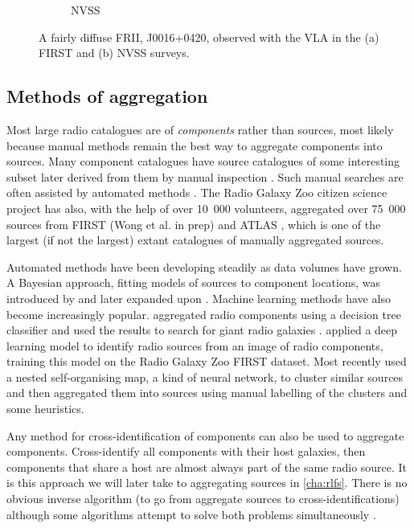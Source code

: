 \begin{figure}
\begin{subfigure}{0.45\textwidth}
                \caption{NVSS}
                \label{fig:im-contours-nvss}
            \end{subfigure}
            \caption[An example of a `resolved out' radio galaxy.]{\label{fig:resolved-out} A fairly diffuse FRII, J0016+0420, observed with the VLA in the (a) FIRST \citep{becker95first} and (b) NVSS\citep{condon98nvss} surveys. \citep[GRG1 from ][]{dabhade_discovery_2017}}
        \end{figure}

    \subsection{Methods of aggregation}
    \label{sec:methods-aggregation}

        Most large radio catalogues are of \emph{components} rather than sources, most likely because manual methods remain the best way to aggregate components into sources. Many component catalogues have source catalogues of some interesting subset later derived from them by manual inspection \citep[e.g.][]{dabhade_discovery_2017}. Such manual searches are often assisted by automated methods \citep[e.g.][]{proctor_morphological_2011}. The Radio Galaxy Zoo citizen science project has also, with the help of over 10~000 volunteers, aggregated over 75~000 sources from FIRST (Wong et al. in prep) and ATLAS \citep{banfield15}, which is one of the largest (if not the largest) extant catalogues of manually aggregated sources.

        Automated methods have been developing steadily as data volumes have grown. A Bayesian approach, fitting models of sources to component locations, was introduced by \citet{fan15} and later expanded upon \citep{fan_optimal_2020}. Machine learning methods have also become increasingly popular. \citet{proctor_selection_2016} aggregated radio components using a decision tree classifier and used the results to search for giant radio galaxies \citep[see also][]{proctor_morphological_2011,proctor06}. \citet{wu19claran} applied a deep learning model to identify radio sources from an image of radio components, training this model on the Radio Galaxy Zoo FIRST dataset. Most recently \citet{galvin_cataloguing_2020} used a nested self-organising map, a kind of neural network, to cluster similar sources and then aggregated them into sources using manual labelling of the clusters and some heuristics.

        Any method for cross-identification of components can also be used to aggregate components. Cross-identify all components with their host galaxies, then components that share a host are almost always part of the same radio source. It is this approach we will later take to aggregating sources in \autoref{cha:rlfs}. There is no obvious inverse algorithm (to go from aggregate sources to cross-identifications) although some algorithms attempt to solve both problems simultaneously \citep{fan_optimal_2020,fan15}.


